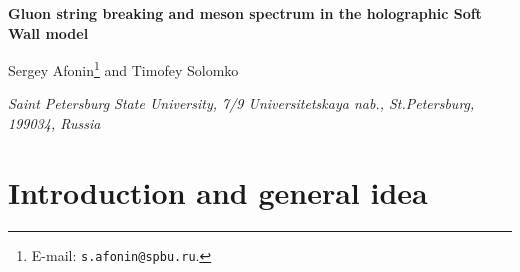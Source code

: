 \documentclass[a4paper,11pt]{article}
\begin{document}
\renewcommand*{\thefootnote}{\fnsymbol{footnote}}

\begin{center}
{\large\bf  Gluon string breaking and meson spectrum in the holographic Soft Wall model}
\end{center}
\bigskip
\begin{center}
{ Sergey Afonin\footnote{E-mail: \texttt{s.afonin@spbu.ru}.}
and Timofey Solomko}
\end{center}

\renewcommand*{\thefootnote}{\arabic{footnote}}
\setcounter{footnote}{0}

\begin{center}
{\small\it Saint Petersburg State University, 7/9 Universitetskaya nab.,
St.Petersburg, 199034, Russia}
\end{center}

\bigskip


\begin{abstract}
We propose a general method for finding a string-like meson spectrum which is based on
a certain condition for the breaking of closed gluon string. A model is constructed that
successfully realizes the proposed method.
The model is based on the holographic Soft Wall model for QCD and the use of the Wilson confinement criterion.
We applied our approach to the vector and scalar cases and obtained numerical predictions for the intercepts
of corresponding Regge like radial meson spectra. A good agreement is obtained both with the existing
experimental data and with some other known phenomenological approaches.
Remarkably, our closed string breaking condition has two branches. We argue that they should correspond
to states of opposite parity. The Wilson confinement criterion leads then to a natural mass splitting
between parity partners. The constructed model represents thus the first example of bottom-up holographic model
in which the effects of chiral symmetry breaking can emerge automatically, i.e., without additional assumptions
taken outside of the holographic approach.
\end{abstract}

\bigskip


\section{Introduction and general idea}
\end{document}
